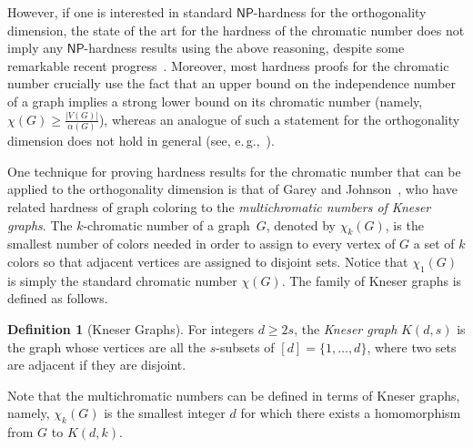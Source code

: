\documentclass[11pt]{article}
\numberwithin{equation}{section}
\theoremstyle{definition}
\newtheorem{definition}[theorem]{Definition}
\theoremstyle{plain}
\newcommand{\NP}{\mathsf{NP}}
\begin{document}
However, if one is interested in standard $\NP$-hardness for the orthogonality dimension, the state of the art for the hardness of the chromatic number does not imply
%
%
%
any $\NP$-hardness  %
results using the above reasoning, despite some remarkable recent progress~\cite{BartoBKO21,WZ20}.
Moreover, most hardness proofs for the chromatic number crucially use the fact that an upper bound on the independence number of a graph implies a strong lower bound on its chromatic number (namely, $\chi(G) \geq \frac{|V(G)|}{\alpha(G)}$), whereas an analogue of such a statement for the orthogonality dimension does not hold in general (see, e.\,g.,~\cite[Proposition~2.2]{HavivMFCS19}).

One technique for proving hardness results for the chromatic number that can be applied %
to  %
the orthogonality dimension is that of Garey and Johnson~\cite{GareyJ76a}, who have related hardness of graph coloring to the \emph{multichromatic numbers of Kneser graphs}. The
%
$k$-chromatic
number of a graph~$G$, denoted by $\chi_k(G)$, is the smallest number of colors needed in order to assign to every vertex of $G$ a set of $k$ colors so that adjacent vertices are assigned to disjoint sets. Notice that $\chi_1(G)$ is simply the standard chromatic number $\chi(G)$. The family of Kneser graphs is defined as follows.
\begin{definition}[Kneser Graphs]\label{def:Kneser}
For integers $d \geq 2s$, the \emph{Kneser graph} $K(d,s)$ is the graph whose vertices are all the $s$-subsets of $[d]=\{1,\ldots,d\}$, where two sets are adjacent if they are disjoint.
\end{definition}
\noindent
Note that the multichromatic numbers can be defined in terms of Kneser graphs, namely, $\chi_k(G)$ is the smallest integer $d$ for which there exists a homomorphism from $G$ to $K(d,k)$.
\end{document}
